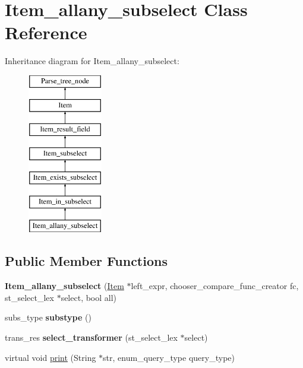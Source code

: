 \hypertarget{classItem__allany__subselect}{}\section{Item\+\_\+allany\+\_\+subselect Class Reference}
\label{classItem__allany__subselect}
Inheritance diagram for Item\+\_\+allany\+\_\+subselect\+:\begin{figure}[H]
\begin{center}
\leavevmode
\includegraphics[height=7.000000cm]{classItem__allany__subselect}
\end{center}
\end{figure}
\subsection*{Public Member Functions}
\begin{DoxyCompactItemize}
\item 
\mbox{\label{classItem__allany__subselect_a806fb7ea20b54eb0a9e74ad49cb258a7}} 
{\bfseries Item\+\_\+allany\+\_\+subselect} (\mbox{\hyperlink{classItem}{Item}} $\ast$left\+\_\+expr, chooser\+\_\+compare\+\_\+func\+\_\+creator fc, st\+\_\+select\+\_\+lex $\ast$select, bool all)
\item 
\mbox{\label{classItem__allany__subselect_a2d6357e62e3a4bbba9bf34a3a995fcfd}} 
subs\+\_\+type {\bfseries substype} ()
\item 
\mbox{\label{classItem__allany__subselect_aaa5534ab26ead2defed935ae4a07b839}} 
trans\+\_\+res {\bfseries select\+\_\+transformer} (st\+\_\+select\+\_\+lex $\ast$select)
\item 
virtual void \mbox{\hyperlink{classItem__allany__subselect_ade4b2eaa6af0cde005b082598d2e31b0}{print}} (String $\ast$str, enum\+\_\+query\+\_\+type query\+\_\+type)
\end{DoxyCompactItemize}
